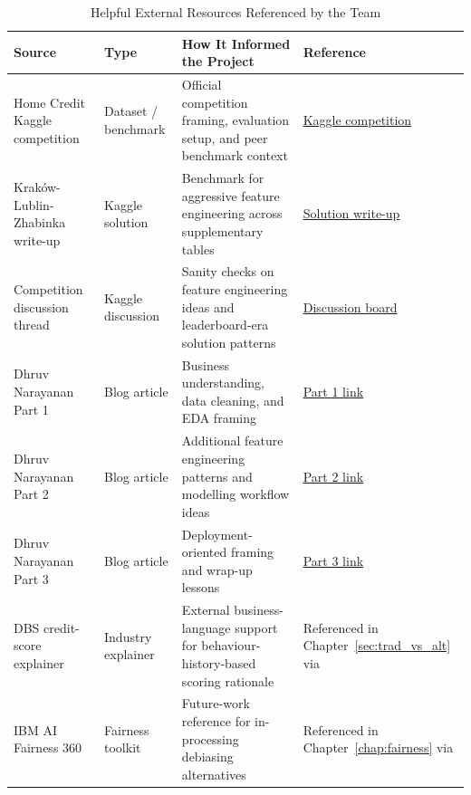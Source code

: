 \begin{table}[H]
\centering
\caption{Helpful External Resources Referenced by the Team}
\label{tab:appendix_helpful_links}
\renewcommand{\arraystretch}{1.16}
\begin{tabular}{p{3.1cm}p{2cm}p{4.1cm}p{4.3cm}}
\toprule
\textbf{Source} & \textbf{Type} & \textbf{How It Informed the Project} & \textbf{Reference} \\
\midrule
Home Credit Kaggle competition & Dataset / benchmark & Official competition framing, evaluation setup, and peer benchmark context & \href{https://www.kaggle.com/c/home-credit-default-risk}{Kaggle competition} \\
Krak\'{o}w-Lublin-Zhabinka write-up & Kaggle solution & Benchmark for aggressive feature engineering across supplementary tables & \href{https://www.kaggle.com/competitions/home-credit-default-risk/writeups/krak-w-lublin-i-zhabinka-overview-of-the-5th-solut}{Solution write-up} \\
Competition discussion thread & Kaggle discussion & Sanity checks on feature engineering ideas and leaderboard-era solution patterns & \href{https://www.kaggle.com/competitions/home-credit-default-risk/discussion}{Discussion board} \\
Dhruv Narayanan Part 1 & Blog article & Business understanding, data cleaning, and EDA framing & \href{https://medium.com/analytics-vidhya/home-credit-default-risk-part-1-business-understanding-data-cleaning-and-eda-1203913e979c}{Part 1 link} \\
Dhruv Narayanan Part 2 & Blog article & Additional feature engineering patterns and modelling workflow ideas & \href{https://medium.com/analytics-vidhya/home-credit-default-risk-part-2-feature-engineering-and-modelling-63f3c6d398a6}{Part 2 link} \\
Dhruv Narayanan Part 3 & Blog article & Deployment-oriented framing and wrap-up lessons & \href{https://medium.com/analytics-vidhya/home-credit-default-risk-part-3-model-deployment-and-final-thoughts-4ee20abf230b}{Part 3 link} \\
DBS credit-score explainer & Industry explainer & External business-language support for behaviour-history-based scoring rationale & Referenced in Chapter~\ref{sec:trad_vs_alt} via \cite{dbs_credit_score} \\
IBM AI Fairness 360 & Fairness toolkit & Future-work reference for in-processing debiasing alternatives & Referenced in Chapter~\ref{chap:fairness} via \cite{aif360,adversarial_debiasing} \\
\bottomrule
\end{tabular}
\end{table}
